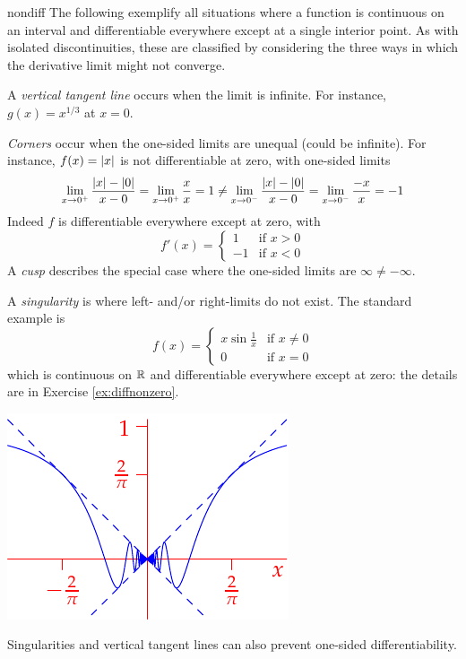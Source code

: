 \begin{examples}{}{nondiff}
	The following exemplify all situations where a function is continuous on an interval and differentiable everywhere except at a single interior point. As with isolated discontinuities, these are classified by considering the three ways in which the derivative limit might not converge. 
	\begin{enumerate}
		\item A \emph{vertical tangent line} occurs when the limit is infinite. For instance, $g(x)=x^{1/3}$ at $x=0$. 
		
	  \item\label{ex:nondiff2} \emph{Corners} occur when the one-sided limits are unequal (could be infinite). For instance, $f(x)=\left| x\right|$ is not differentiable at zero, with one-sided limits
	  \begin{gather*}
		  \lim_{x\to 0^+}\frac{\left| x\right|-\left| 0\right|}{x-0}=\lim_{x\to 0^+}\frac xx =1\neq
		  \lim_{x\to 0^-}\frac{\left| x\right|-\left| 0\right|}{x-0}=\lim_{x\to 0^-}\frac{-x}x =-1
	  \end{gather*}
		Indeed $f$ is differentiable everywhere except at zero, with
	  \[
	  	f'(x)=
	  	\begin{cases}
				1&\text{if }x>0\\
				-1&\text{if }x<0
			\end{cases}
		\]
		A \emph{cusp} describes the special case where the one-sided limits are $\infty\neq-\infty$. 
	
		\begin{minipage}[t]{0.64\linewidth}\vspace{0pt}
		  \item\label{ex:nondiff3} A \emph{singularity} is where left- and/or right-limits do not exist. The standard example is
		  \[
		  	f(x)=
		  	\begin{cases}
		  		x\sin\frac 1x&\text{if }x\neq 0\\
		  		0&\text{if }x=0
		  	\end{cases}
		  \]
		  which is continuous on $\mathbb{R}$ and differentiable everywhere except at zero: the details are in Exercise \ref{ex:diffnonzero}.
	  \end{minipage}
	  \hfill
	  \begin{minipage}[t]{0.34\linewidth}\vspace{0pt}
	  	\flushright\includegraphics[scale=0.95]{unifcontex2}
	  \end{minipage}
	\end{enumerate}
	 Singularities and vertical tangent lines can also prevent one-sided differentiability.
\end{examples}

